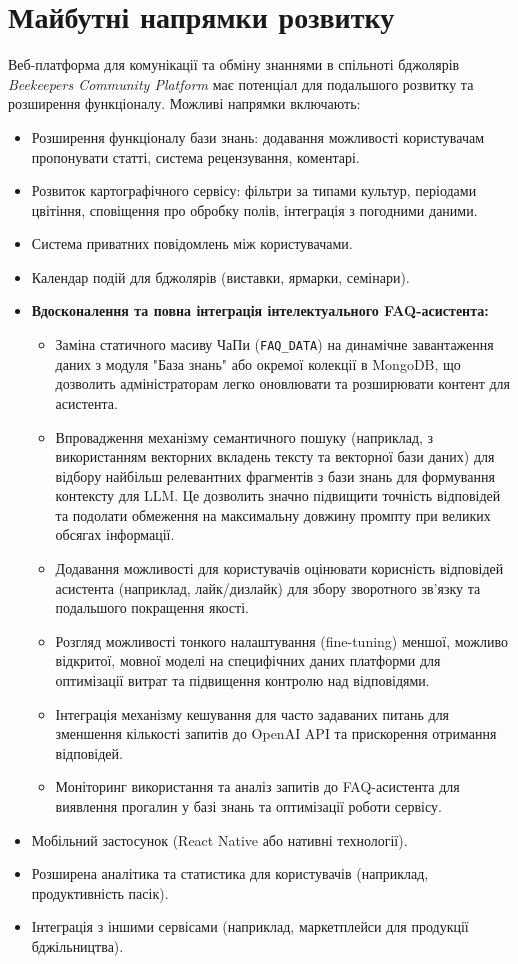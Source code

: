 \section{Майбутні напрямки розвитку}
\label{sec:future_work}
Веб-платформа для комунікації та обміну знаннями в спільноті бджолярів \textit{Beekeepers Community Platform} має потенціал для подальшого розвитку та розширення функціоналу. Можливі напрямки включають:
\begin{itemize}
    \item Розширення функціоналу бази знань: додавання можливості користувачам пропонувати статті, система рецензування, коментарі.
    \item Розвиток картографічного сервісу: фільтри за типами культур, періодами цвітіння, сповіщення про обробку полів, інтеграція з погодними даними.
    \item Система приватних повідомлень між користувачами.
    \item Календар подій для бджолярів (виставки, ярмарки, семінари).
    \item \textbf{Вдосконалення та повна інтеграція інтелектуального FAQ-асистента:}
        \begin{itemize}
            \item Заміна статичного масиву ЧаПи (\texttt{FAQ\_DATA}) на динамічне завантаження даних з модуля "База знань" або окремої колекції в MongoDB, що дозволить адміністраторам легко оновлювати та розширювати контент для асистента.
            \item Впровадження механізму семантичного пошуку (наприклад, з використанням векторних вкладень тексту та векторної бази даних) для відбору найбільш релевантних фрагментів з бази знань для формування контексту для LLM. Це дозволить значно підвищити точність відповідей та подолати обмеження на максимальну довжину промпту при великих обсягах інформації.
            \item Додавання можливості для користувачів оцінювати корисність відповідей асистента (наприклад, лайк/дизлайк) для збору зворотного зв'язку та подальшого покращення якості.
            \item Розгляд можливості тонкого налаштування (fine-tuning) меншої, можливо відкритої, мовної моделі на специфічних даних платформи для оптимізації витрат та підвищення контролю над відповідями.
            \item Інтеграція механізму кешування для часто задаваних питань для зменшення кількості запитів до OpenAI API та прискорення отримання відповідей.
            \item Моніторинг використання та аналіз запитів до FAQ-асистента для виявлення прогалин у базі знань та оптимізації роботи сервісу.
        \end{itemize}
    \item Мобільний застосунок (React Native або нативні технології).
    \item Розширена аналітика та статистика для користувачів (наприклад, продуктивність пасік).
    \item Інтеграція з іншими сервісами (наприклад, маркетплейси для продукції бджільництва).
\end{itemize} 